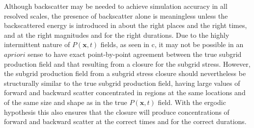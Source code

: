 Although backscatter may be needed to achieve simulation accuracy in all resolved scales, the presence of backscatter alone is meaningless unless the backscattered energy is introduced in about the right places and the right times, and at the right magnitudes and for the right durations. Due to the highly intermittent nature of  $P(\mathbf{x},t)$  fields, as seen in c, it may not be possible in an $a priori$ sense to have exact point-by-point agreement between the true subgrid production field and that resulting from a closure for the subgrid stress. However, the subgrid production field from a subgrid stress closure should nevertheless be structurally similar to the true subgrid production field, having large values of forward and backward scatter concentrated in regions at the same locations and of the same size and shape as in the true  $P(\mathbf{x},t)$  field. With the ergodic hypothesis this also ensures that the closure will produce concentrations of forward and backward scatter at the correct times and for the correct durations.

